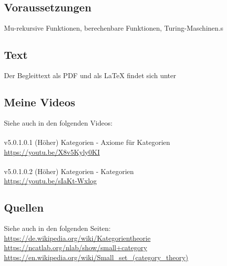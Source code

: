 \documentclass[a4paper]{amsart}
\theoremstyle{definition}
\begin{document}
\subsection*{Voraussetzungen}
Mu-rekursive Funktionen, berechenbare Funktionen, Turing-Maschinen.s

\subsection*{Text}
Der Begleittext als PDF und als LaTeX findet sich unter
{\tiny
   \url{}
}

\subsection*{Meine Videos}
Siehe auch in den folgenden Videos:\\
\\
v5.0.1.0.1 (Höher) Kategorien - Axiome für Kategorien\\
\url{https://youtu.be/X8v5Kyly0KI}\\
\\
v5.0.1.0.2 (Höher) Kategorien - Kategorien\\
\url{https://youtu.be/sIaKt-Wxlog}\\

\subsection*{Quellen}
Siehe auch in den folgenden Seiten:\\
\url{https://de.wikipedia.org/wiki/Kategorientheorie}\\
\url{https://ncatlab.org/nlab/show/small+category}\\
\url{https://en.wikipedia.org/wiki/Small_set_(category_theory)}\\
\end{document}
